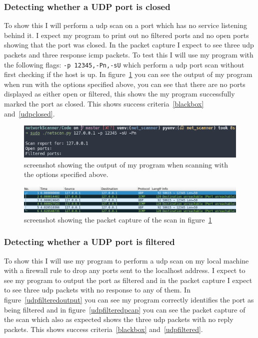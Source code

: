 \documentclass[titlepage]{article}
\let\Oldsubsubsection\subsubsection{}
\renewcommand{\subsubsection}{\FloatBarrier\Oldsubsubsection}
\begin{document}
\subsubsection{Detecting whether a UDP port is closed}
To show this I will perform a \gls{udp} scan on a port which
has no service listening behind it. I expect my program to print out
no filtered ports and no open ports showing that the port was closed.
In the packet capture I expect to see three \gls{udp} packets and three response
\gls{icmp} packets. To test this I will use my program with the following flags:
\verb|-p 12345,-Pn,-sU| which perform a \gls{udp} port scan without first checking
if the host is up. In figure~\ref{udpclosedoutput} you can see the output of my program
when run with the options specified above, you can see that there are no ports displayed
as either open or filtered, this shows the my program successfully marked the port as closed.
This shows success criteria~\ref{blackbox} and~\ref{udpclosed}.

\begin{figure}[H]
  \centering
  \includegraphics[width=\textwidth]{screenshots/udpclosedoutput.png}
  \caption{%
    screenshot showing the output of my program when scanning with the
    options specified above.
  }\label{udpclosedoutput}
\end{figure}

\begin{figure}[H]
  \centering
  \includegraphics[width=\textwidth]{screenshots/udpclosedpcap.png}
  \caption{%
    screenshot showing the packet capture of the scan in figure~\ref{udpclosedoutput}
  }\label{udpclosedcap}
\end{figure}

\subsubsection{Detecting whether a UDP port is filtered}
To show this I will use my program to perform a \gls{udp} scan on my local machine
with a firewall rule to drop any ports sent to the localhost address. I expect to see
my program to output the port as filtered and in the packet capture I expect to see
three \gls{udp} packets with no response to any of them.
In figure~\ref{udpfilteredoutput} you can see my program correctly identifies
the port as being filtered and in figure~\ref{udpfilteredpcap} you can see
the packet capture of the scan which also as expected shows the three \gls{udp}
packets with no reply packets. This shows success criteria~\ref{blackbox}
and~\ref{udpfiltered}.
\end{document}
